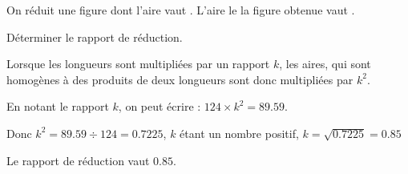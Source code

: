 \begin{exercice*}
    On réduit une figure dont l'aire vaut . L'aire le la figure obtenue vaut .

    \medskip
    Déterminer le rapport de réduction.
\end{exercice*}
\begin{corrige}
    Lorsque les longueurs sont multipliées par un rapport $k$, les aires, qui sont homogènes à 
    des produits de deux longueurs sont donc multipliées par $k^2$.

    En notant le rapport $k$, on peut écrire : $124\times k^2 = \num{89.59}$.

    Donc $k^2 = \num{89.59}\div 124 = \num{0.7225}$, $k$ étant un nombre positif, $k=\sqrt{\num{0.7225}} = \num{0.85}$

    \medskip
    Le rapport de réduction vaut $\num{0.85}$.
\end{corrige}

